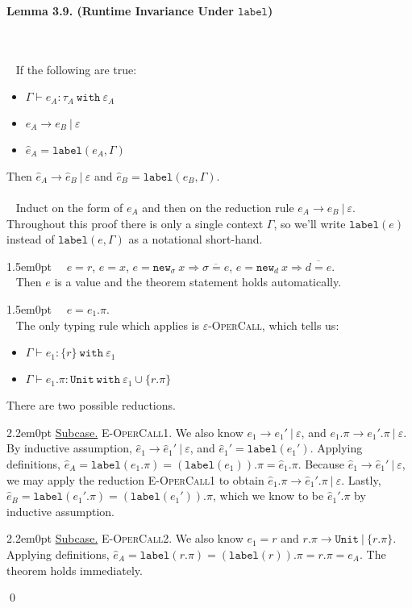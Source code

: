 \documentclass{llncs}
\newcommand{\keywadj}[1]{\mathtt{#1}}
\newcommand{\keyw}[1]{\keywadj{#1}~}
\newcommand{\thm}[3]{
	\begin{large}
		\bf{#1}
	\end{large} \\\\
	\fbox{Statement.} ~ #2
	\fbox{Proof.}~ #3 \qed
}
\newcommand{\proofcase}[2]{
	\begin{adjustwidth}{1.5em}{0pt}
		\fbox{Case.}~~#1. \\ ~#2
	\end{adjustwidth}
}
\newcommand{\subcase}[1] {
	\begin{adjustwidth}{2.2em}{0pt}
		\underline{Subcase.} #1
	\end{adjustwidth}
}
\newcommand{\type}[2]{
	#1~\keyw{with} #2
}
\newcommand{\newd}[0]{
	\keywadj{new}_d~x \Rightarrow \overline{d = e}
}
\newcommand{\newsig}[0]{
	\keywadj{new}_\sigma~x \Rightarrow \overline{\sigma = e}
}
\begin{document}
\noindent
\thm{Lemma 3.9. (Runtime Invariance Under $\keywadj{label}$)}
{If the following are true:
	\begin{itemize}
	\item $\Gamma \vdash e_A : \type{\tau_A}{\varepsilon_A}$
	\item $e_A \longrightarrow e_B~|~\varepsilon$
	\item $\hat e_A = \keywadj{label}(e_A, \Gamma)$
	\end{itemize}
Then $\hat e_A \longrightarrow \hat e_B~|~\varepsilon$ and $\hat e_B = \keywadj{label}(e_B, \Gamma)$.\\\\
}
{Induct on the form of $e_A$ and then on the reduction rule $e_A \longrightarrow e_B~|~\varepsilon$. Throughout this proof there is only a single context $\Gamma$, so we'll write $\keywadj{label}(e)$ instead of $\keywadj{label}(e, \Gamma)$ as a notational short-hand.\\

\proofcase{$e=r$, $e=x$, $e=\newsig$, $e=\newd$}{
	Then $e$ is a value and the theorem statement holds automatically.\\
}

\proofcase{$e=e_1.\pi$}{
The only typing rule which applies is \textsc{$\varepsilon$-OperCall}, which tells us:
	\begin{itemize}
		\item $\Gamma \vdash e_1 : \type{ \{ r \} }{\varepsilon_1}$
		\item $\Gamma \vdash e_1.\pi : \type{\keywadj{Unit}}{\varepsilon_1 \cup \{ r.\pi \}}$
	\end{itemize}
\noindent
There are two possible reductions. \\

\subcase{\textsc{E-OperCall1}. We also know $e_1 \longrightarrow e_1'~|~\varepsilon$, and $e_1.\pi \longrightarrow e_1'.\pi~|~\varepsilon$. By inductive assumption, $\hat e_1 \longrightarrow \hat e_1'~|~\varepsilon$, and $\hat e_1' = \keywadj{label}(e_1')$. Applying definitions, $\hat e_A = \keywadj{label}(e_1.\pi) = (\keywadj{label}(e_1)).\pi = \hat e_1.\pi$. Because $\hat e_1 \longrightarrow \hat e_1'~|~\varepsilon$, we may apply the reduction \textsc{E-OperCall1} to obtain $\hat e_1.\pi \longrightarrow \hat e_1'.\pi~|~\varepsilon$. Lastly, $\hat e_B = \keywadj{label}(e_1'.\pi) = (\keywadj{label}(e_1')).\pi$, which we know to be $\hat e_1'.\pi$ by inductive assumption.\\
}

\subcase{\textsc{E-OperCall2}. We also know $e_1 = r$ and $r.\pi \longrightarrow \keywadj{Unit}~|~\{ r.\pi \}$. Applying definitions, $\hat e_A = \keywadj{label}(r.\pi) = (\keywadj{label}(r)).\pi = r.\pi = e_A$. The theorem holds immediately.\\

}}}
\end{document}

